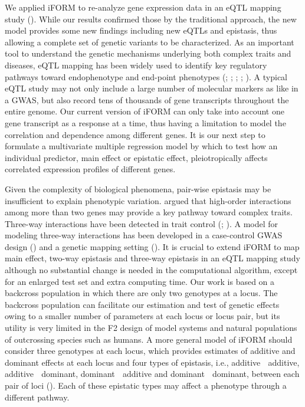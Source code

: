 \documentclass[11pt,]{book}
\theoremstyle{definition}
\theoremstyle{definition}
\theoremstyle{remark}
\begin{document}
We applied iFORM to re-analyze gene expression data in an eQTL mapping
study (\cite{rockman2010selection}). While our results confirmed those
by the traditional approach, the new model provides some new findings
including new eQTLs and epistasis, thus allowing a complete set of
genetic variants to be characterized. As an important tool to understand
the genetic mechanisms underlying both complex traits and diseases, eQTL
mapping has been widely used to identify key regulatory pathways toward
endophenotype and end-point phenotypes (\cite{schadt2005integrative};
\cite{emilsson2008genetics}; \cite{cookson2009mapping};
\cite{pickrell2010understanding}; \cite{nica2013expression}). A typical
eQTL study may not only include a large number of molecular markers as
like in a GWAS, but also record tens of thousands of gene transcripts
throughout the entire genome. Our current version of iFORM can only take
into account one gene transcript as a response at a time, thus having a
limitation to model the correlation and dependence among different
genes. It is our next step to formulate a multivariate multiple
regression model by which to test how an individual predictor, main
effect or epistatic effect, pleiotropically affects correlated
expression profiles of different genes.

Given the complexity of biological phenomena, pair-wise epistasis may be
insufficient to explain phenotypic variation.
\cite{imielinski2008exploiting} argued that high-order interactions
among more than two genes may provide a key pathway toward complex
traits. Three-way interactions have been detected in trait control
(\cite{mcmullen1998quantitative}; \cite{stich2007power}). A model for
modeling three-way interactions has been developed in a case-control
GWAS design (\cite{wang2010general}) and a genetic mapping setting
(\cite{pang2013statistical}). It is crucial to extend iFORM to map main
effect, two-way epistasis and three-way epistasis in an eQTL mapping
study although no substantial change is needed in the computational
algorithm, except for an enlarged test set and extra computing time. Our
work is based on a backcross population in which there are only two
genotypes at a locus. The backcross population can facilitate our
estimation and test of genetic effects owing to a smaller number of
parameters at each locus or locus pair, but its utility is very limited
in the F2 design of model systems and natural populations of outcrossing
species such as humans. A more general model of iFORM should consider
three genotypes at each locus, which provides estimates of additive and
dominant effects at each locus and four types of epistasis, i.e.,
additive  additive, additive  dominant, dominant  additive and
dominant  dominant, between each pair of loci
(\cite{kempthorne1968correlation}). Each of these epistatic types may
affect a phenotype through a different pathway.
\end{document}
